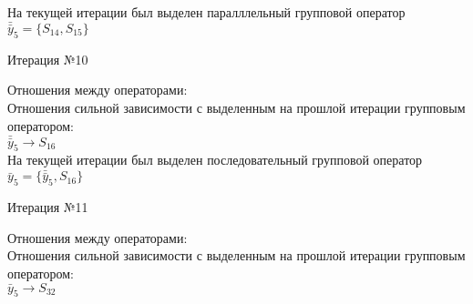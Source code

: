 \documentclass[a4paper,14pt]{article}
\begin{document}
%
На текущей итерации был выделен паралллельный групповой оператор $\bar{\bar{y}}_{5} = \{S_{14}, S_{15}\}$
\begin{center} Итерация №10 \end{center}
Отношения между операторами: \\
Отношения сильной зависимости с выделенным на прошлой итерации групповым оператором: \\ \newline
\begin{math}
    \bar{\bar{y}}_{5} \rightarrow S_{16}
\end{math}\\ \newline
%
На текущей итерации был выделен последовательный групповой оператор $\bar{y}_{5} = \{\bar{\bar{y}}_{5}, S_{16}\}$
\begin{center} Итерация №11 \end{center}
Отношения между операторами: \\
Отношения сильной зависимости с выделенным на прошлой итерации групповым оператором: \\ \newline
\begin{math}
    \bar{y}_{5} \rightarrow S_{32}
\end{math} \\ \\ \\ 
%
\end{document}
